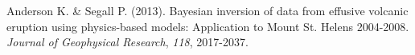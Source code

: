 \begin{thebibliography}{99}
   Anderson K. \& Segall P. (2013). Bayesian inversion of data from effusive volcanic eruption using physics-based models: Application to Mount St. Helens 2004-2008. \textit{Journal of Geophysical Research}, \textit{118}, 2017-2037.
\end{thebibliography}
